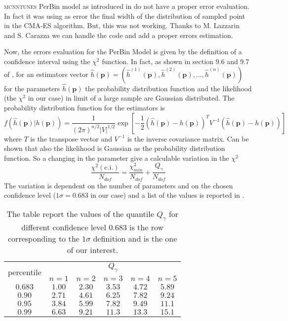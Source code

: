 \textsc{mcnntunes} PerBin model as introduced in \cite{MCNNTUNESarticle} do not have a proper error evaluation. In fact it was using as error the final width of the distribution of sampled point in the CMA-ES algorithm. But, this was not working. Thanks to M. Lazzarin and S. Carazza we can handle the code and add a proper errors estimation.

Now, the errors evaluation for the PerBin Model is given by the definition of a confidence interval using the $\chi^2$ function.
In fact, as shown in section 9.6 and 9.7 of \cite{cowan}, for an estimators vector $\hat{h}(\mathbf{p})=(\hat{h}^{(1)}(\mathbf{p}),\hat{h}^{(2)}(\mathbf{p}),\dots,\hat{h}^{(n)}(\mathbf{p}))$ for the parameters $\hat{h}(\mathbf{p})$ the probability distribution function and the likelihood (the $\chi^2$ in our case) in limit of a large sample are Gaussian distributed. The probability distribution function for the estimators is 
\begin{equation}
f(\hat{h}(\mathbf{p})|h(\mathbf{p})) = \frac{1}{(2\pi)^{n/2}|V|^{1/2}}\exp\left[ -\frac{1}{2}\left(\hat{h}(\mathbf{p}) - h(\mathbf{p})\right)^T V^{-1} \left(\hat{h}(\mathbf{p}) - h(\mathbf{p})\right) \right] 
\end{equation}
where $T$ is the transpose vector and $V^{-1}$ is the inverse covariance matrix. 
Can be shown that also the likelihood is Gaussian as the probability distribution function. So a changing in the parameter give a calculable variation in the $\chi^2$
\begin{equation}
	\frac{\chi^2(\text{c.i.})}{N_{dof}}= \frac{\chi^2_{min}}{N_{dof}}+\frac{Q_\gamma}{N_{dof}}
	\label{eq:chi2_variation}
\end{equation} 
The variation is dependent on the number of parameters and on the chosen confidence level ($1\sigma=0.683$ in our case) and a list of the values is reported in .

\begin{table}
	\centering
	\begin{tabular}{c | c c c c c}
		\multirow{ 2}{*}{percentile} & \multicolumn{5}{c}{$Q_\gamma$}\\\cline{2-6}
		& $n=1$ & $n=2$ & $n=3$ & $n=4$ & $n=5$ \\\hline\hline
		$0.683$& $ 1.00 $ & $ 2.30 $ & $ 3.53 $ & $ 4.72 $ & $ 5.89 $ \\
		$0.90$ &  $ 2.71 $ & $ 4.61 $ & $ 6.25 $ & $ 7.82 $ & $ 9.24 $ \\
		$0.95$ & $ 3.84 $ & $ 5.99 $ & $ 7.82 $ & $ 9.49 $ & $ 11.1 $ \\
		$0.99$ & $ 6.63 $ & $ 9.21 $ & $ 11.3 $ & $ 13.3 $ & $ 15.1 $ \\
	\end{tabular}
	\caption{The table report the values of the quantile $Q_\gamma$ for different confidence level $0.683$ is the row corresponding to the $1\sigma$ definition and is the one of our interest.}
	\label{table:percentile}
\end{table}

